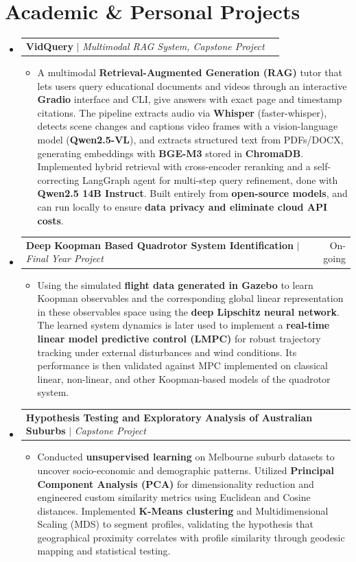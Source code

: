 \documentclass[a4paper,10pt]{article}
\makeatletter
\newcommand{\resumeProjectHeading}[2]{
	\vspace{5pt}\item
	\begin{tabular*}{0.99\textwidth}{l@{\extracolsep{\fill}}r}
		\small#1 & \small#2 \\
	\end{tabular*}\vspace{3pt}
}
\newcommand{\resumeItemDesc}[1]{
	\begin{itemize}[leftmargin=0.32in, label={}, topsep=0pt, partopsep=0pt]
		\item \small{#1}
	\end{itemize}
	\vspace{1pt}
}
\makeatother
\begin{document}
	\section{Academic \& Personal Projects}
	\begin{itemize}[leftmargin=0.15in, label={}]
		
		\resumeProjectHeading
		{\textbf{VidQuery} $|$ \emph{Multimodal RAG System, Capstone Project}}{}
		\vspace{-6pt}
		\resumeItemDesc{A multimodal \textbf{Retrieval-Augmented Generation (RAG)} tutor that lets users query educational documents and videos through an interactive \textbf{Gradio} interface and CLI, give answers with exact page and timestamp citations. The pipeline extracts audio via \textbf{Whisper} (faster-whisper), detects scene changes and captions video frames with a vision-language model (\textbf{Qwen2.5-VL}), and extracts structured text from PDFs/DOCX, generating embeddings with \textbf{BGE-M3} stored in \textbf{ChromaDB}. Implemented hybrid retrieval with cross-encoder reranking and a self-correcting LangGraph agent for multi-step query refinement, done with \textbf{Qwen2.5 14B Instruct}. Built entirely from \textbf{open-source models}, and can run locally to ensure \textbf{data privacy and eliminate cloud API costs}.}
		
		\resumeProjectHeading
		{\textbf{Deep Koopman Based Quadrotor System Identification} $|$ \emph{Final Year Project}}{On-going}
		\vspace{-6pt}
		\resumeItemDesc{Using the simulated \textbf{flight data generated in Gazebo} to learn Koopman observables and the corresponding global linear representation in these observables space using the \textbf{deep Lipschitz neural network}. The learned system dynamics is later used to implement a \textbf{real-time linear model predictive control (LMPC)} for robust trajectory tracking under external disturbances and wind conditions. Its performance is then validated against MPC implemented on classical linear, non-linear, and other Koopman-based models of the quadrotor system.}
		
		\resumeProjectHeading
		{\textbf{Hypothesis Testing and Exploratory Analysis of Australian Suburbs} $|$ \emph{Capstone Project}}{}
		\vspace{-6pt}
		\resumeItemDesc{Conducted \textbf{unsupervised learning} on Melbourne suburb datasets to uncover socio-economic and demographic patterns. Utilized \textbf{Principal Component Analysis (PCA)} for dimensionality reduction and engineered custom similarity metrics using Euclidean and Cosine distances. Implemented \textbf{K-Means clustering} and Multidimensional Scaling (MDS) to segment profiles, validating the hypothesis that geographical proximity correlates with profile similarity through geodesic mapping and statistical testing.}
		

\end{itemize}
\end{document}

